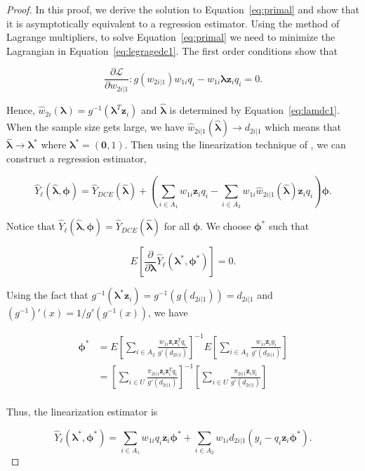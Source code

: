 \documentclass[12pt]{article}
\renewcommand{\bf}[1]{\mathbf{#1}}
\begin{document}
\begin{proof}
  In this proof, we derive the solution to Equation~\ref{eq:primal} and show
  that it is asymptotically equivalent to a regression estimator. Using the
  method of Lagrange multipliers, to solve Equation~\eqref{eq:primal} we need to
  minimize the Lagrangian in Equation~\eqref{eq:legragedc1}. 
  The first order conditions show that

  $$
  \frac{\partial \mathcal{L}}{\partial w_{2i|1}}: g(w_{2i|1}) w_{1i}q_i -
  w_{1i} \bm \lambda \bf z_i q_i = 0.
  $$

  Hence, $\hat w_{2i}(\bm \lambda) = g^{-1}(\bm \lambda^T \bf z_i)$ and
  $\hat{\bm \lambda}$ is determined by Equation~\eqref{eq:lamdc1}. When the
  sample size gets large, we have $\hat w_{2i|1}(\hat{\bm \lambda}) \to
  d_{2i|1}$ which means that $\hat{\bm \lambda} \to \bm \lambda^*$ where $\bm
  \lambda^* = (\bf 0, 1)$. Then using the linearization technique of
  \cite{randles1982asymptotic}, we can construct a regression estimator, 

  $$
  \hat Y_\ell(\hat{\bm \lambda}, \bm \phi)  = \hat Y_{DCE}(\hat{\bm \lambda}) + 
  \left(\sum_{i \in A_1} w_{1i} \bm z_i q_i - \sum_{i \in A_2} w_{1i} 
  \hat w_{2i|1}(\hat{\bm \lambda}) \bf z_i q_i\right)\bm \phi.
  $$

  Notice that $\hat Y_\ell(\hat{\bm \lambda}, \bm \phi) = \hat Y_{DCE}(\hat{\bm
  \lambda})$ for all $\bm \phi$. We choose $\bm \phi^*$ such that

  $$
  E\left[\frac{\partial}{\partial \bm \lambda} \hat Y_\ell(\bm \lambda^*,
  \bm \phi^*)\right]=0.
  $$

  Using the fact that $g^{-1}(\bm \lambda^* \bf z_i) = g^{-1}(g(d_{2i|1})) = d_{2i|1}$
  and $(g^{-1})'(x) = 1 / g'(g^{-1}(x))$, we have

  \begin{align*}
    \bm \phi^*
    &= E\left[\sum_{i \in A_2} \frac{w_{1i}\bf z_i \bf z_i^T q_i}{g'(d_{2i|1})}
    \right]^{-1}
    E\left[\sum_{i \in A_2} \frac{w_{1i}\bf z_i y_i}{g'(d_{2i|1})}\right]\\
    &= \left[\sum_{i \in U} \frac{\pi_{2i|1} \bf z_i \bf z_i^T q_i}{g'(d_{2i|1})}
    \right]^{-1}
    \left[\sum_{i \in U} \frac{\pi_{2i|1} \bf z_i y_i}{g'(d_{2i|1})}\right]\\
  \end{align*}

  Thus, the linearization estimator is

  $$\hat Y_\ell(\bm \lambda^*, \bm \phi^*) = 
  \sum_{i \in A_1} w_{1i} q_i \bf z_i \bm \phi^* +
  \sum_{i \in A_2} w_{1i} d_{2i|1} (y_i - q_i \bf z_i \bm \phi^*).$$


\end{proof}
\end{document}
